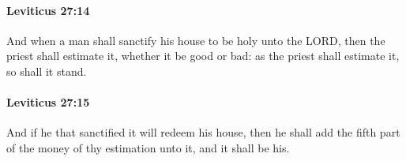 		\paragraph{Leviticus 27:14} %
			\label{LEVITICUS-27-14}

			And when a man shall sanctify his house to be holy unto the LORD, then the priest shall estimate it, whether it be good or bad: as the priest shall estimate it, so shall it stand.


		\paragraph{Leviticus 27:15} %
			\label{LEVITICUS-27-15}

			And if he that sanctified it will redeem his house, then he shall add the fifth part of the money of thy estimation unto it, and it shall be his.


